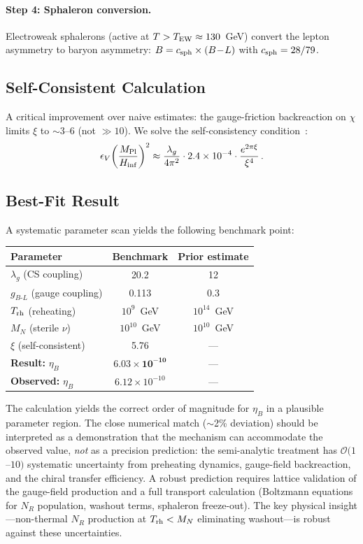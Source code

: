 \documentclass[a4paper,11pt]{article}
\newcommand{\MPl}{M_{\rm Pl}}
\newcommand{\chif}{\chi}
\newcommand{\lag}{\lambda_g}
\newcommand{\gBL}{g_{B\text{-}L}}
\newcommand{\etaB}{\eta_B}
\newcommand{\e}[1]{\times 10^{#1}}
\begin{document}
\paragraph{Step 4: Sphaleron conversion.} Electroweak sphalerons (active at $T > T_{\rm EW} \approx 130$~GeV) convert the lepton asymmetry to baryon asymmetry: $B = c_{\rm sph} \times (B\!-\!L)$ with $c_{\rm sph} = 28/79$.

\subsection{Self-Consistent Calculation}

A critical improvement over naive estimates: the gauge-friction backreaction on $\chif$ limits $\xi$ to $\sim$3--6 (not $\gg 10$). We solve the self-consistency condition~\cite{Adshead2012}:
\begin{equation}
\epsilon_V \bigg(\frac{\MPl}{H_{\rm inf}}\bigg)^2 \approx \frac{\lag}{4\pi^2}\cdot 2.4\e{-4}\cdot\frac{e^{2\pi\xi}}{\xi^4}\,.
\end{equation}

\subsection{Best-Fit Result}

A systematic parameter scan yields the following benchmark point:

\begin{center}
\begin{tabular}{lcc}
\toprule
\textbf{Parameter} & \textbf{Benchmark} & \textbf{Prior estimate} \\
\midrule
$\lag$ (CS coupling) & 20.2 & 12 \\
$\gBL$ (gauge coupling) & 0.113 & 0.3 \\
$T_{\rm rh}$ (reheating) & $10^9$~GeV & $10^{14}$~GeV \\
$M_N$ (sterile $\nu$) & $10^{10}$~GeV & $10^{10}$~GeV \\
$\xi$ (self-consistent) & 5.76 & --- \\
\midrule
\textbf{Result:} $\etaB$ & $\mathbf{6.03 \e{-10}}$ & --- \\
\textbf{Observed:} $\etaB$ & $6.12 \e{-10}$ & --- \\
\bottomrule
\end{tabular}
\end{center}

\noindent The calculation yields the correct order of magnitude for $\etaB$ in a plausible parameter region. The close numerical match ($\sim$2\% deviation) should be interpreted as a demonstration that the mechanism can accommodate the observed value, \textit{not} as a precision prediction: the semi-analytic treatment has $\mathcal{O}(1$--$10)$ systematic uncertainty from preheating dynamics, gauge-field backreaction, and the chiral transfer efficiency. A robust prediction requires lattice validation of the gauge-field production and a full transport calculation (Boltzmann equations for $N_R$ population, washout terms, sphaleron freeze-out). The key physical insight---non-thermal $N_R$ production at $T_{\rm rh} < M_N$ eliminating washout---is robust against these uncertainties.
\end{document}
